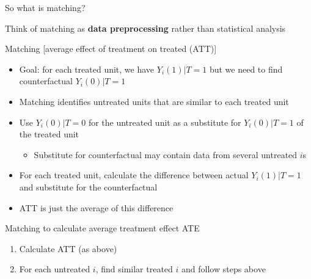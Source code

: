\begin{frame}[shrink=10]{So what is matching?}

Think of matching as \textbf{data preprocessing} rather than statistical analysis \\
\vspace{3mm}

Matching [average effect of treatment on treated (ATT)]
\begin{itemize}
	\item Goal: for each treated unit, we have $Y_i(1)|T=1$ but we need to find counterfactual $Y_i(0)|T=1$
	\item Matching identifies untreated units that are similar to each treated unit
	\item Use $Y_i(0)|T=0$ for the untreated unit as a substitute for $Y_i(0)|T=1$ of the treated unit
	\begin{itemize}
		\item Substitute for counterfactual may contain data from several untreated $i$s
	\end{itemize}
	\item For each treated unit, calculate the difference between actual  $Y_i(1)|T=1$ and substitute for the counterfactual
	\item ATT is just the average of this difference
\end{itemize}

\vspace{3mm}

Matching to calculate average treatment effect ATE
\begin{enumerate}
	\item Calculate ATT (as above)
	\item For each untreated $i$, find similar treated $i$ and follow steps above
\end{enumerate}

\end{frame}


